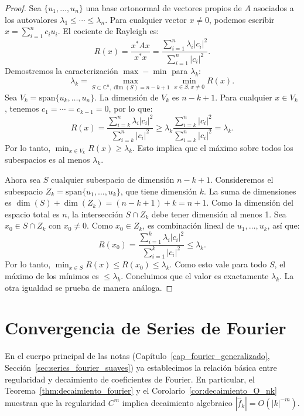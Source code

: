 \documentclass[a4paper,11pt]{report}
\begin{document}
\begin{proof}
Sea $\{u_1, \ldots, u_n\}$ una base ortonormal de vectores propios de $A$ asociados a los autovalores $\lambda_1 \leq \cdots \leq \lambda_n$.
Para cualquier vector $x \neq 0$, podemos escribir $x = \sum_{i=1}^n c_i u_i$. El cociente de Rayleigh es:
\[
R(x) = \frac{x^* A x}{x^* x} = \frac{\sum_{i=1}^n \lambda_i |c_i|^2}{\sum_{i=1}^n |c_i|^2}.
\]
Demostremos la caracterización $\max-\min$ para $\lambda_k$:
\[
\lambda_k = \max_{S \subset \mathbb{C}^n, \dim(S)=n-k+1} \min_{x \in S, x \neq 0} R(x).
\]
Sea $V_k = \text{span}\{u_k, \ldots, u_n\}$. La dimensión de $V_k$ es $n-k+1$. Para cualquier $x \in V_k$, tenemos $c_1 = \cdots = c_{k-1} = 0$, por lo que:
\[
R(x) = \frac{\sum_{i=k}^n \lambda_i |c_i|^2}{\sum_{i=k}^n |c_i|^2} \geq \lambda_k \frac{\sum_{i=k}^n |c_i|^2}{\sum_{i=k}^n |c_i|^2} = \lambda_k.
\]
Por lo tanto, $\min_{x \in V_k} R(x) \geq \lambda_k$. Esto implica que el máximo sobre todos los subespacios es al menos $\lambda_k$.

Ahora sea $S$ cualquier subespacio de dimensión $n-k+1$. Consideremos el subespacio $Z_k = \text{span}\{u_1, \ldots, u_k\}$, que tiene dimensión $k$.
La suma de dimensiones es $\dim(S) + \dim(Z_k) = (n-k+1) + k = n+1$.
Como la dimensión del espacio total es $n$, la intersección $S \cap Z_k$ debe tener dimensión al menos 1.
Sea $x_0 \in S \cap Z_k$ con $x_0 \neq 0$. Como $x_0 \in Z_k$, es combinación lineal de $u_1, \ldots, u_k$, así que:
\[
R(x_0) = \frac{\sum_{i=1}^k \lambda_i |c_i|^2}{\sum_{i=1}^k |c_i|^2} \leq \lambda_k.
\]
Por lo tanto, $\min_{x \in S} R(x) \leq R(x_0) \leq \lambda_k$.
Como esto vale para todo $S$, el máximo de los mínimos es $\leq \lambda_k$.
Concluimos que el valor es exactamente $\lambda_k$. La otra igualdad se prueba de manera análoga.
\end{proof}


\chapter{Convergencia de Series de Fourier \label{app_convergencia_fourier}}

En el cuerpo principal de las notas (Capítulo~\ref{cap_fourier_generalizado}, Sección~\ref{sec:series_fourier_suaves}) ya establecimos la relación básica entre regularidad y decaimiento de coeficientes de Fourier. En particular, el Teorema~\ref{thm:decaimiento_fourier} y el Corolario~\ref{cor:decaimiento_O_nk} muestran que la regularidad $C^m$ implica decaimiento algebraico $|\hat f_k|=O(|k|^{-m})$.
\end{document}
